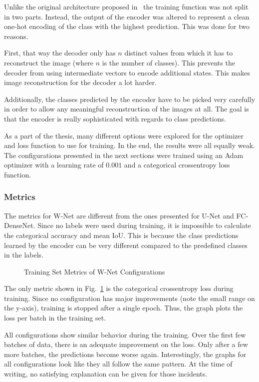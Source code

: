 Unlike the original architecture proposed in~\cite{wnet17} the training function was not split in two parts. Instead, the output of the encoder was altered to represent a clean one-hot encoding of the class with the highest prediction. This was done for two reasons.

First, that way the decoder only has $n$ distinct values from which it has to reconstruct the image (where $n$ is the number of classes). This prevents the decoder from using intermediate vectors to encode additional states. This makes image reconstruction for the decoder a lot harder.

Additionally, the classes predicted by the encoder have to be picked very carefully in order to allow any meaningful reconstruction of the images at all. The goal is that the encoder is really sophisticated with regards to class predictions.

As a part of the thesis, many different options were explored for the optimizer and loss function to use for training. In the end, the results were all equally weak. The configurations presented in the next sections were trained using an Adam optimizer with a learning rate of $0.001$ and a categorical crossentropy loss function.

\subsubsection{Metrics}
The metrics for W-Net are different from the ones presented for U-Net and FC-DenseNet. Since no labels were used during training, it is impossible to calculate the categorical accuracy and mean IoU. This is because the class predictions learned by the encoder can be very different compared to the predefined classes in the labels.

\begin{figure}[h]
    \centering
            
    \caption{Training Set Metrics of W-Net Configurations}
    \label{fig:wnet_train_metrics}
\end{figure}

The only metric shown in Fig.~\ref{fig:wnet_train_metrics} is the categorical crossentropy loss during training. Since no configuration has major improvements (note the small range on the y-axis), training is stopped after a single epoch. Thus, the graph plots the loss per batch in the training set.

All configurations show similar behavior during the training. Over the first few batches of data, there is an adequate improvement on the loss. Only after a few more batches, the predictions become worse again. Interestingly, the graphs for all configurations look like they all follow the same pattern. At the time of writing, no satisfying explanation can be given for those incidents.

